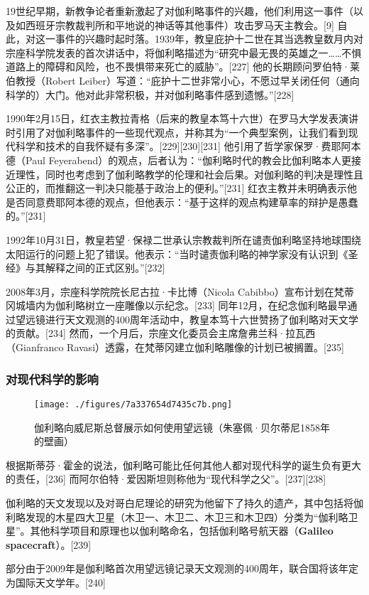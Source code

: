 19世纪早期，新教争论者重新激起了对伽利略事件的兴趣，他们利用这一事件（以及如西班牙宗教裁判所和平地说的神话等其他事件）攻击罗马天主教会。[9] 自此，对这一事件的兴趣时起时落。1939年，教皇庇护十二世在其当选教皇数月内对宗座科学院发表的首次讲话中，将伽利略描述为“研究中最无畏的英雄之一……不惧道路上的障碍和风险，也不畏惧带来死亡的威胁”。[227] 他的长期顾问罗伯特·莱伯教授（Robert Leiber）写道：“庇护十二世非常小心，不愿过早关闭任何（通向科学的）大门。他对此非常积极，并对伽利略事件感到遗憾。”[228]  

1990年2月15日，红衣主教拉青格（后来的教皇本笃十六世）在罗马大学发表演讲时引用了对伽利略事件的一些现代观点，并称其为“一个典型案例，让我们看到现代科学和技术的自我怀疑有多深”。[229][230][231] 他引用了哲学家保罗·费耶阿本德（Paul Feyerabend）的观点，后者认为：“伽利略时代的教会比伽利略本人更接近理性，同时也考虑到了伽利略教学的伦理和社会后果。对伽利略的判决是理性且公正的，而推翻这一判决只能基于政治上的便利。”[231] 红衣主教并未明确表示他是否同意费耶阿本德的观点，但他表示：“基于这样的观点构建草率的辩护是愚蠢的。”[231]  

1992年10月31日，教皇若望·保禄二世承认宗教裁判所在谴责伽利略坚持地球围绕太阳运行的问题上犯了错误。他表示：“当时谴责伽利略的神学家没有认识到《圣经》与其解释之间的正式区别。”[232]  

2008年3月，宗座科学院院长尼古拉·卡比博（Nicola Cabibbo）宣布计划在梵蒂冈城墙内为伽利略树立一座雕像以示纪念。[233] 同年12月，在纪念伽利略最早通过望远镜进行天文观测的400周年活动中，教皇本笃十六世赞扬了伽利略对天文学的贡献。[234] 然而，一个月后，宗座文化委员会主席詹弗兰科·拉瓦西（Gianfranco Ravasi）透露，在梵蒂冈建立伽利略雕像的计划已被搁置。[235]
\subsubsection{对现代科学的影响}
\begin{figure}[ht]
\centering
\texttt{[image: ./figures/7a337654d7435c7b.png]}
\caption{伽利略向威尼斯总督展示如何使用望远镜（朱塞佩·贝尔蒂尼1858年的壁画）} \label{fig_JLL_18}
\end{figure}
根据斯蒂芬·霍金的说法，伽利略可能比任何其他人都对现代科学的诞生负有更大的责任，[236] 而阿尔伯特·爱因斯坦则称他为“现代科学之父”。[237][238]  

伽利略的天文发现以及对哥白尼理论的研究为他留下了持久的遗产，其中包括将伽利略发现的木星四大卫星（木卫一、木卫二、木卫三和木卫四）分类为“伽利略卫星”。其他科学项目和原理也以伽利略命名，包括伽利略号航天器（\textbf{Galileo spacecraft}）。[239]  

部分由于2009年是伽利略首次用望远镜记录天文观测的400周年，联合国将该年定为国际天文学年。[240]  
